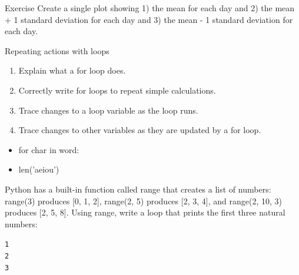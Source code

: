 \documentclass{beamer}
\begin{document}

\begin{frame}{Exercise}
Create a single plot showing 1) the mean for each day and 2) the mean + 1 standard deviation for each day and 3) the mean - 1 standard deviation for each day.

\end{frame}

\begin{frame}{Repeating actions with loops}

\begin{enumerate}
    \item{Explain what a for loop does.}
    \item Correctly write for loops to repeat simple calculations.
    \item{Trace changes to a loop variable as the loop runs.}
    \item{Trace changes to other variables as they are updated by a for loop.}
   \end{enumerate}

\begin{multicols}{2}
\begin{itemize}
\item for char in word:
\item len('aeiou')
\end{itemize}
\end{multicols}
\end{frame}

\begin{frame}{ }

Python has a built-in function called range that creates a list of numbers: range(3) produces [0, 1, 2], range(2, 5) produces [2, 3, 4], and range(2, 10, 3) produces [2, 5, 8]. Using range, write a loop that prints the first three natural numbers:

\vspace{0.5cm}

\begin{beamerboxesrounded}[upper=uppercolgreen,lower=lowercolgreen,shadow=false]{}
\texttt{1\\
2\\
3}
\end{beamerboxesrounded}

\end{frame}
\end{document}
